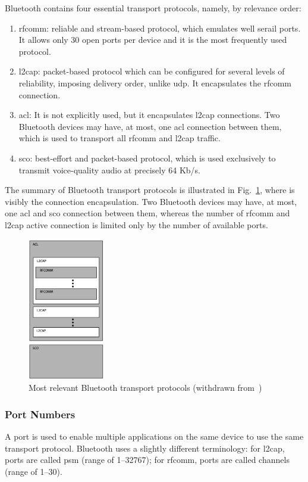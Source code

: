 Bluetooth contains four essential transport protocols, namely, by relevance
order:
\begin{enumerate}
\item \gls{rfcomm}: reliable and stream-based protocol, which emulates well
  serail ports. It allows only 30 open ports per device and it is the most
  frequently used protocol.
\item \gls{l2cap}: packet-based protocol which can be configured for several
  levels of reliability, imposing delivery order, unlike \gls{udp}. It
  encapsulates the \gls{rfcomm} connection.
\item \gls{acl}: It is not explicitly used, but it encapsulates \gls{l2cap}
  connections. Two Bluetooth devices may have, at most, one \gls{acl} connection
  between them, which is used to transport all \gls{rfcomm} and \gls{l2cap}
  traffic.
\item \gls{sco}: best-effort and packet-based protocol, which is used
  exclusively to transmit voice-quality audio at precisely 64 Kb/s.
\end{enumerate}
The summary of Bluetooth transport protocols is illustrated in
Fig.~\ref{fig:bt-transport-protocols-summary}, where is visibly the connection
encapsulation. Two Bluetooth devices may have, at most, one \gls{acl} and \gls{sco} connection
between them, whereas the number of \gls{rfcomm} and \gls{l2cap} active
connection is limited only by the number of available ports.
\begin{figure}[!hbt]
\centering
    \includegraphics[width=0.3\textwidth]{./img/bt-transport-protocols-summary.png}
  \caption{Most relevant Bluetooth transport protocols (withdrawn from~\cite{huang2007bluetooth})}%
\label{fig:bt-transport-protocols-summary}
\end{figure}
\newpage
%
\subsubsection{Port Numbers}%
\label{sec:bt-port-nrs}
%
A port is used to enable multiple applications on the same device to use the
same transport protocol. Bluetooth uses a slightly different terminology: for
\gls{l2cap}, ports are called \gls{psm} (range of 1--32767); for
\gls{rfcomm}, ports are called channels (range of 1--30).

